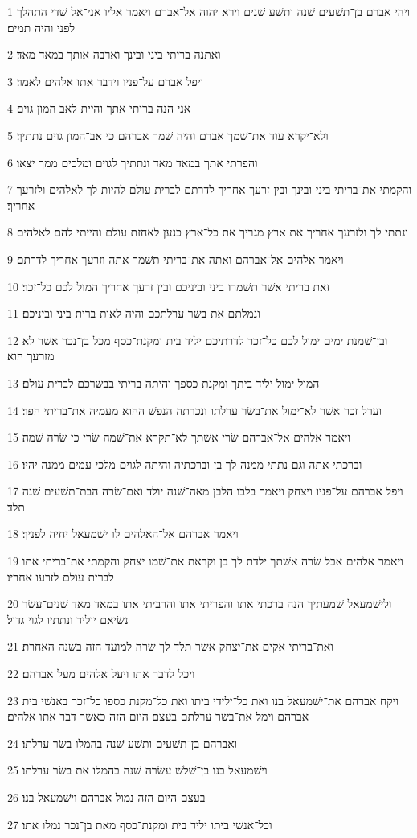 \par 1 ויהי אברם בן־תשׁעים שׁנה ותשׁע שׁנים וירא יהוה אל־אברם ויאמר אליו אני־אל שׁדי התהלך לפני והיה תמים׃
\par 2 ואתנה בריתי ביני ובינך וארבה אותך במאד מאד׃
\par 3 ויפל אברם על־פניו וידבר אתו אלהים לאמר׃
\par 4 אני הנה בריתי אתך והיית לאב המון גוים׃
\par 5 ולא־יקרא עוד את־שׁמך אברם והיה שׁמך אברהם כי אב־המון גוים נתתיך׃
\par 6 והפרתי אתך במאד מאד ונתתיך לגוים ומלכים ממך יצאו׃
\par 7 והקמתי את־בריתי ביני ובינך ובין זרעך אחריך לדרתם לברית עולם להיות לך לאלהים ולזרעך אחריך׃
\par 8 ונתתי לך ולזרעך אחריך את ארץ מגריך את כל־ארץ כנען לאחזת עולם והייתי להם לאלהים׃
\par 9 ויאמר אלהים אל־אברהם ואתה את־בריתי תשׁמר אתה וזרעך אחריך לדרתם׃
\par 10 זאת בריתי אשׁר תשׁמרו ביני וביניכם ובין זרעך אחריך המול לכם כל־זכר׃
\par 11 ונמלתם את בשׂר ערלתכם והיה לאות ברית ביני וביניכם׃
\par 12 ובן־שׁמנת ימים ימול לכם כל־זכר לדרתיכם יליד בית ומקנת־כסף מכל בן־נכר אשׁר לא מזרעך הוא׃
\par 13 המול ימול יליד ביתך ומקנת כספך והיתה בריתי בבשׂרכם לברית עולם׃
\par 14 וערל זכר אשׁר לא־ימול את־בשׂר ערלתו ונכרתה הנפשׁ ההוא מעמיה את־בריתי הפר׃
\par 15 ויאמר אלהים אל־אברהם שׂרי אשׁתך לא־תקרא את־שׁמה שׂרי כי שׂרה שׁמה׃
\par 16 וברכתי אתה וגם נתתי ממנה לך בן וברכתיה והיתה לגוים מלכי עמים ממנה יהיו׃
\par 17 ויפל אברהם על־פניו ויצחק ויאמר בלבו הלבן מאה־שׁנה יולד ואם־שׂרה הבת־תשׁעים שׁנה תלד׃
\par 18 ויאמר אברהם אל־האלהים לו ישׁמעאל יחיה לפניך׃
\par 19 ויאמר אלהים אבל שׂרה אשׁתך ילדת לך בן וקראת את־שׁמו יצחק והקמתי את־בריתי אתו לברית עולם לזרעו אחריו׃
\par 20 ולישׁמעאל שׁמעתיך הנה ברכתי אתו והפריתי אתו והרביתי אתו במאד מאד שׁנים־עשׂר נשׂיאם יוליד ונתתיו לגוי גדול׃
\par 21 ואת־בריתי אקים את־יצחק אשׁר תלד לך שׂרה למועד הזה בשׁנה האחרת׃
\par 22 ויכל לדבר אתו ויעל אלהים מעל אברהם׃
\par 23 ויקח אברהם את־ישׁמעאל בנו ואת כל־ילידי ביתו ואת כל־מקנת כספו כל־זכר באנשׁי בית אברהם וימל את־בשׂר ערלתם בעצם היום הזה כאשׁר דבר אתו אלהים׃
\par 24 ואברהם בן־תשׁעים ותשׁע שׁנה בהמלו בשׂר ערלתו׃
\par 25 וישׁמעאל בנו בן־שׁלשׁ עשׂרה שׁנה בהמלו את בשׂר ערלתו׃
\par 26 בעצם היום הזה נמול אברהם וישׁמעאל בנו׃
\par 27 וכל־אנשׁי ביתו יליד בית ומקנת־כסף מאת בן־נכר נמלו אתו׃

